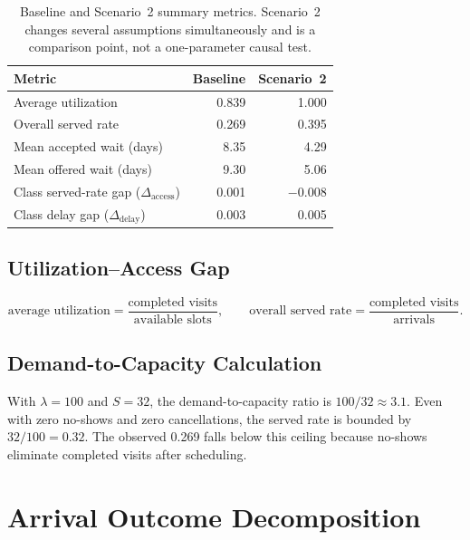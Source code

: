\documentclass[11pt]{article}
\begin{document}
\begin{table}[H]
\centering
\renewcommand{\arraystretch}{1.18}
\begin{tabular}{lrr}
\toprule
Metric & Baseline & Scenario~2 \\
\midrule
Average utilization & 0.839 & 1.000 \\
Overall served rate & 0.269 & 0.395 \\
Mean accepted wait (days) & 8.35 & 4.29 \\
Mean offered wait (days) & 9.30 & 5.06 \\
Class served-rate gap ($\Delta_{\text{access}}$) & 0.001 & $-$0.008 \\
Class delay gap ($\Delta_{\text{delay}}$) & 0.003 & 0.005 \\
\bottomrule
\end{tabular}
\caption{Baseline and Scenario~2 summary metrics.  Scenario~2 changes
  several assumptions simultaneously and is a comparison point, not a
  one-parameter causal test.}
\end{table}

\subsection{Utilization--Access Gap}

\[
  \text{average utilization} = \frac{\text{completed visits}}{\text{available slots}},
  \qquad
  \text{overall served rate} = \frac{\text{completed visits}}{\text{arrivals}}.
\]

\subsection{Demand-to-Capacity Calculation}

With $\lambda = 100$ and $S = 32$, the demand-to-capacity ratio is
$100/32 \approx 3.1$.  Even with zero no-shows and zero cancellations,
the served rate is bounded by $32/100 = 0.32$.  The observed 0.269
falls below this ceiling because no-shows eliminate completed visits
after scheduling.

\section{Arrival Outcome Decomposition}
\end{document}
